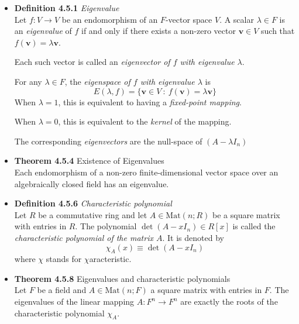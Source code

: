 \documentclass[11pt,a4paper]{article}
\begin{document}
\begin{itemize}
    \item \textbf{Definition 4.5.1} \emph{Eigenvalue} \\
        Let $f : V \to V$ be an endomorphism of an $F$-vector space $V$.
        A scalar $\lambda \in F$ is an \emph{eigenvalue} of $f$ if and only if there exists
        a non-zero vector $\textbf{v} \in V$ such that $f(\textbf{v}) = \lambda \textbf{v}$.

        Each such vector is called an \emph{eigenvector of $f$ with eigenvalue $\lambda$}.

        For any $\lambda \in F$, the \emph{eigenspace of $f$ with eigenvalue $\lambda$} is
        \[
            E(\lambda, f) = \{ \textbf{v} \in V \ : \ f(\textbf{v}) = \lambda \textbf{v} \}
        \]
        When $\lambda = 1$, this is equivalent to having a \emph{fixed-point mapping}.

        When $\lambda = 0$, this is equivalent to the \emph{kernel} of the mapping.

        The corresponding \emph{eigenvectors} are the null-space of $(A - \lambda I_n)$

    \item \textbf{Theorem 4.5.4} Existence of Eigenvalues \\
        Each endomorphism of a non-zero finite-dimensional vector space over an algebraically
        closed field has an eigenvalue.

    \item \textbf{Definition 4.5.6} \emph{Characteristic polynomial} \\
        Let $R$ be a commutative ring and let $A \in \mathrm{Mat}(n; R)$ be a square matrix
        with entries in $R$.
        The polynomial $\det (A - x I_n) \in R[x]$ is called the
        \emph{characteristic polynomial of the matrix $A$}.
        It is denoted by
        \[
            \chi_A (x) \equiv \det(A - x I_n)
        \]
        where $\chi$ stands for $\chi$aracteristic.

    \item \textbf{Theorem 4.5.8} Eigenvalues and characteristic polynomials \\
        Let $F$ be a field and $A \in \mathrm{Mat}(n; F)$ a square matrix with entries in $F$.
        The eigenvalues of the linear mapping $A : F^n \to F^n$ are exactly the roots of the
        characteristic polynomial $\chi_A$.

\end{itemize}
\end{document}
